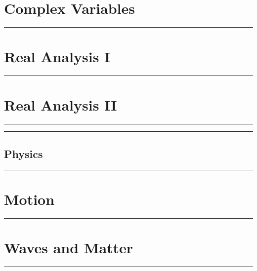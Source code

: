 \documentclass[10pt,titlepage]{asmath}
\newcommand{\hdiv}[3]{
  \vspace{#1}%
  \noindent\rule{\textwidth}{#2}%
  \vspace{#3}%
}
\theoremstyle{definition}
\begin{document}
\newpage
\part{Complex Variables}%
\label{prt:complex_variables}
\hdiv{10pt}{2pt}{10pt}
\begin{multicols}{2}
  
\end{multicols}

\newpage
\part{Real Analysis I}%
\label{prt:real_analysis_i}
\hdiv{10pt}{2pt}{10pt}
\begin{multicols}{2}
  
\end{multicols}

\newpage
\part{Real Analysis II}%
\label{prt:real_analysis_ii}
\hdiv{10pt}{2pt}{10pt}
\begin{multicols}{2}
  
\end{multicols}

\newpage
\vspace*{\fill}
\hdiv{10pt}{3pt}{15pt}
\chapter{Physics}%
\label{cha:Physics}
\hdiv{15pt}{3pt}{10pt}
\vspace*{\fill}
\newpage

\newpage
\part{Motion}
\label{prt:motion}
\hdiv{10pt}{2pt}{10pt}
\begin{multicols}{2}
  
\end{multicols}

\newpage
\part{Waves and Matter}
\label{prt:waves_and_matter}
\hdiv{10pt}{2pt}{10pt}
\begin{multicols}{2}
  
\end{multicols}
\end{document}
